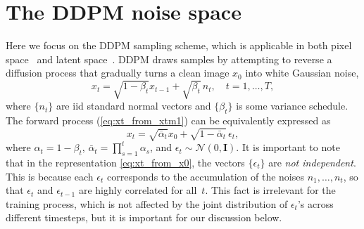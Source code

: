 \section{The DDPM noise space}
\label{method}







Here we focus on the DDPM sampling scheme, which is applicable in both pixel space~\cite{Ho20} and latent space~\cite{Rombach22}. %
DDPM draws samples by attempting to reverse a diffusion process that gradually turns a clean image $x_0$ into white Gaussian noise,
\begin{equation}
\label{eq:xt_from_xtm1}
x_t = \sqrt{1-\beta_t} x_{t-1} + \sqrt{\beta_t}\, n_t,\quad t=1,\ldots,T,
\end{equation}
where $\{n_t\}$ are iid standard normal vectors and $\{\beta_t\}$ is some variance schedule. The forward process (\ref{eq:xt_from_xtm1}) can be equivalently expressed as
\begin{equation}
\label{eq:xt_from_x0}
x_t = \sqrt{\bar\alpha_t} x_0 + \sqrt{1-\bar\alpha_t}\, \epsilon_t,
\end{equation}
where $\alpha_t=1-\beta_t$, $\bar{\alpha}_t=\prod_{s=1}^t\alpha_s$, and $\epsilon_t\sim\mathcal{N}(0,\boldsymbol{I})$. It is important to note that in the representation \eqref{eq:xt_from_x0}, the vectors $\{\epsilon_t\}$ are \emph{not independent}. This is because each $\epsilon_t$ corresponds to the accumulation of the noises $n_1,\ldots,n_t$, so that $\epsilon_t$ and $\epsilon_{t-1}$ are highly correlated for all~$t$. This fact is irrelevant for the training process, %
which is not affected by the joint distribution of $\epsilon_t$'s across different timesteps, but it is important for our discussion below.

